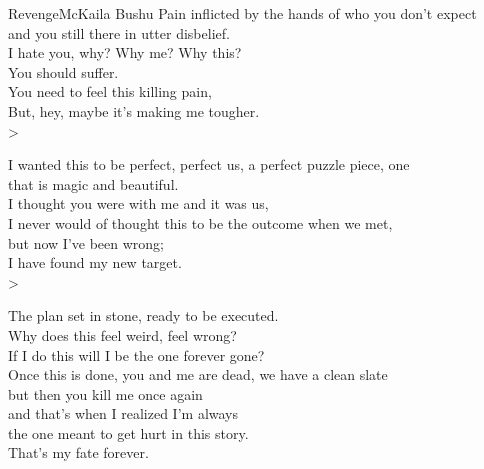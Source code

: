 \begin{poetry}{Revenge}{McKaila Bushu}
Pain inflicted by the hands of who you don't expect\\
and you still there in utter disbelief.\\
I hate you, why? Why me? Why this?\\
You should suffer.\\
You need to feel this killing pain,\\
But, hey, maybe it's making me tougher.\\>

I wanted this to be perfect, perfect us, a perfect puzzle piece, one\\
that is magic and beautiful.\\
I thought you were with me and it was us,\\
I never would of thought this to be the outcome when we met,\\
but now I've been wrong;\\
I have found my new target.\\>

The plan set in stone, ready to be executed.\\
Why does this feel weird, feel wrong?\\
If I do this will I be the one forever gone?\\
Once this is done, you and me are dead, we have a clean slate\\
but then you kill me once again\\
and that's when I realized I'm always\\
the one meant to get hurt in this story.\\
That's my fate forever.
\end{poetry}

